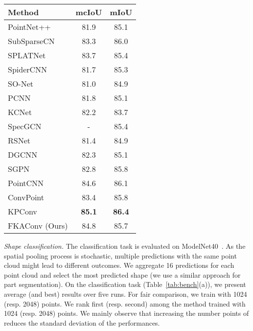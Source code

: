 \begin{table}[t]
\begin{minipage}{0.39\linewidth}
        \begin{tabular}{l|cc}
            \hline
            Method & mcIoU & mIoU \\
            \hline
            PointNet++~\cite{qi2017pointnet++}    & 81.9 & 85.1 \\
            SubSparseCN~\cite{graham20183d}              & 83.3 & 86.0 \\
            SPLATNet~\cite{su2018splatnet}        & 83.7 & 85.4 \\
            SpiderCNN~\cite{xu2018spidercnn}      & 81.7 & 85.3 \\
            SO-Net~\cite{li2018so}                & 81.0 & 84.9 \\
            PCNN~\cite{atzmon2018point}           & 81.8 & 85.1 \\
            KCNet~\cite{shen2018mining}           & 82.2 & 83.7 \\
            SpecGCN~\cite{wang2018local}          &    - & 85.4 \\
            RSNet~\cite{huang2018recurrent}       & 81.4 & 84.9 \\
            DGCNN~\cite{wang2018dynamdynamic}     & 82.3 & 85.1 \\
            SGPN~\cite{wang2018sgpn}              & 82.8 & 85.8 \\
            PointCNN~\cite{li2018pointcnn}         & 84.6 & 86.1 \\
            ConvPoint~\cite{boulch2020convpoint}  & 83.4 & 85.8 \\
            KPConv~\cite{thomas2019kpconv}        & \textbf{85.1} & \textbf{86.4} \\
            \hline
            FKAConv (Ours)   & 84.8 & 85.7\\
        \end{tabular}
        
    \end{minipage}
\end{table}

\textit{Shape classification.}
The classification task is evaluated on ModelNet40~\cite{wu20153d}.
As the spatial pooling process is stochastic, multiple predictions with the same point cloud might lead to different outcomes.
We aggregate 16 predictions for each point cloud and select the most predicted shape (we use a similar approach for part segmentation).
On the classification task (Table~\ref{tab:bench}(a)), we present average (and best) results over five runs.
For fair comparison, we train with 1024 (resp. 2048) points.
We rank first (resp. second) among the method trained with 1024 (resp. 2048) points.
We mainly observe that increasing the number points of reduces the standard deviation of the performances.


